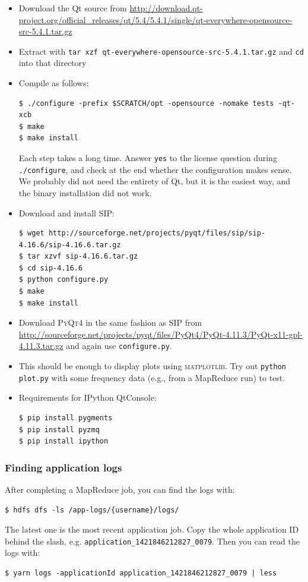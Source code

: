 \documentclass{article}
\begin{document}
\begin{itemize}
  \item Download the Qt source from 
    \url{http://download.qt-project.org/official_releases/qt/5.4/5.4.1/single/qt-everywhere-opensource-src-5.4.1.tar.gz}
  \item Extract with \texttt{tar xzf qt-everywhere-opensource-src-5.4.1.tar.gz} 
    and \texttt{cd} into that directory
  \item Compile as follows:

\begin{verbatim}
$ ./configure -prefix $SCRATCH/opt -opensource -nomake tests -qt-xcb
$ make
$ make install
\end{verbatim}

    Each step takes a long time. Answer \texttt{yes} to the license question 
    during \texttt{./configure}, and check at the end whether the configuration 
    makes sense. We probably did not need the entirety of Qt, but it is the 
    easiest way, and the binary installation did not work.
  \item Download and install \textsc{SIP}:

\begin{verbatim}
$ wget http://sourceforge.net/projects/pyqt/files/sip/sip-4.16.6/sip-4.16.6.tar.gz
$ tar xzvf sip-4.16.6.tar.gz
$ cd sip-4.16.6
$ python configure.py
$ make
$ make install
\end{verbatim}

  \item Download \textsc{PyQt4} in the same fashion as \textsc{SIP} from 
    \url{http://sourceforge.net/projects/pyqt/files/PyQt4/PyQt-4.11.3/PyQt-x11-gpl-4.11.3.tar.gz} 
    and again use \texttt{configure.py}.
  \item This should be enough to display plots using \textsc{matplotlib}. Try 
    out \texttt{python plot.py} with some frequency data (e.g., from 
    a MapReduce run) to test.
  \item Requirements for IPython QtConsole:

\begin{verbatim}
$ pip install pygments
$ pip install pyzmq
$ pip install ipython
\end{verbatim}
\end{itemize}

\subsubsection{Finding application logs}\label{app:finding-application-logs}
After completing a MapReduce job, you can find the logs with:

\begin{verbatim}
$ hdfs dfs -ls /app-logs/{username}/logs/
\end{verbatim}

The latest one is the most recent application job. Copy the whole application 
ID behind the slash, e.g. \texttt{application\_1421846212827\_0079}. Then you 
can read the logs with:

\begin{verbatim}
$ yarn logs -applicationId application_1421846212827_0079 | less
\end{verbatim}
\end{document}

